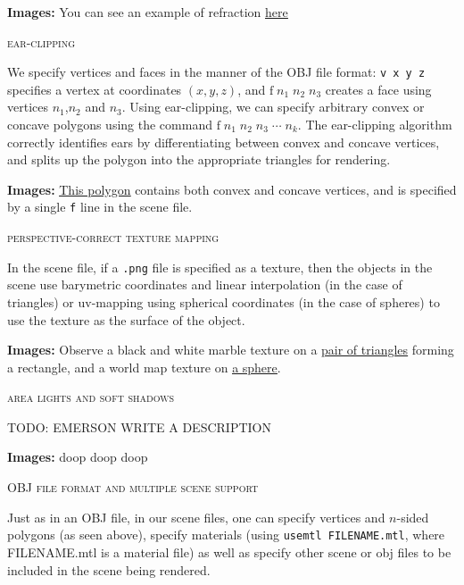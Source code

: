 \documentclass{article}
\begin{document}
\vspace{3mm}
{\bf Images:} You can see an example of refraction \href{run://images/ballrefrac_ja3.png}{\underline{here}}


\begin{center}\textsc{ear-clipping}\end{center} 
We specify vertices and faces in the manner of the OBJ file format: \verb+v x y z+ specifies a vertex at coordinates $(x,y,z)$, and $\mathrm{f}\; n_1 \; n_2 \; n_3$ creates a face using vertices $n_1$,$n_2$ and $n_3$. Using ear-clipping, we can specify arbitrary convex or concave polygons using the command $\mathrm{f }\; n_1 \; n_2 \; n_3 \; \cdots \; n_k$. The ear-clipping algorithm correctly identifies ears by differentiating between convex and concave vertices, and splits up the polygon into the appropriate triangles for rendering.

\vspace{3mm}
{\bf Images:} \href{run://images/meh.png}{\underline{This polygon}} contains both convex and concave vertices, and is specified by a single \verb+f+ line in the scene file.

\begin{center}\textsc{perspective-correct texture mapping}\end{center} 
In the scene file, if a \verb+.png+ file is specified as a texture, then the objects in the scene use barymetric coordinates and linear interpolation (in the case of triangles) or uv-mapping using spherical coordinates (in the case of spheres) to use the texture as the surface of the object.

\vspace{3mm}
{\bf Images:} Observe a black and white marble texture on a \href{run://images/tex.png}{\underline{pair of triangles}} forming a rectangle, and a world map texture on \href{run://images/tex2.png}{\underline{a sphere}}.

\begin{center}\textsc{area lights and soft shadows}\end{center} 
TODO: EMERSON WRITE A DESCRIPTION

\vspace{3mm}
{\bf Images:} doop doop doop

\begin{center}\textsc{OBJ file format and multiple scene support}\end{center} 
Just as in an OBJ file, in our scene files, one can specify vertices and $n$-sided polygons (as seen above), specify materials (using \verb+usemtl FILENAME.mtl+, where FILENAME.mtl is a material file) as well as specify other scene or obj files to be included in the scene being rendered.
\end{document}
